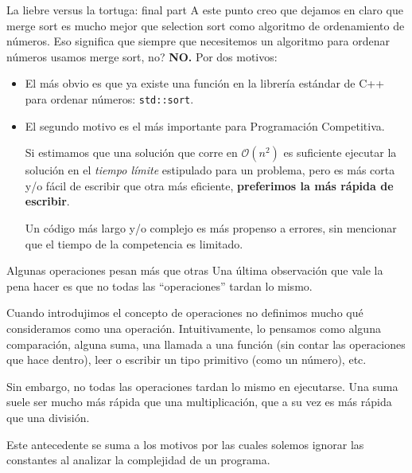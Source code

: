 \documentclass{beamer}
\begin{document}
    \begin{frame}{La liebre versus la tortuga: final part}
        A este punto creo que dejamos en claro que merge sort es mucho mejor que selection sort como algoritmo de ordenamiento de números. \pause Eso significa que siempre que necesitemos un algoritmo para ordenar números usamos merge sort, no? \pause \textbf{NO.} \pause Por dos motivos: \pause

        \begin{itemize}
            \item El más obvio es que ya existe una función en la librería estándar de C++ para ordenar números: \texttt{std::sort}. \pause
            \item El segundo motivo es el más importante para Programación Competitiva. \pause
                
                Si estimamos que una solución que corre en $\mathcal{O}(n^2)$ es suficiente ejecutar la solución en el \textit{tiempo límite} estipulado para un problema, pero es más corta y/o fácil de escribir que otra más eficiente, \textbf{preferimos la más rápida de escribir}. \pause

                Un código más largo y/o complejo es más propenso a errores, sin mencionar que el tiempo de la competencia es limitado.
        \end{itemize}
    \end{frame}

    \begin{frame}{Algunas operaciones pesan más que otras} 
        Una última observación que vale la pena hacer es que no todas las ``operaciones'' tardan lo mismo. \vspace{4pt} \pause

        Cuando introdujimos el concepto de operaciones no definimos mucho qué consideramos como una operación. \pause Intuitivamente, lo pensamos como alguna comparación, alguna suma, una llamada a una función (sin contar las operaciones que hace dentro), leer o escribir un tipo primitivo (como un número), etc. \pause

        Sin embargo, no todas las operaciones tardan lo mismo en ejecutarse. Una suma suele ser mucho más rápida que una multiplicación, que a su vez es más rápida que una división. \pause \vspace{4pt}

        Este antecedente se suma a los motivos por las cuales solemos ignorar las constantes al analizar la complejidad de un programa.
    \end{frame}
\end{document}

